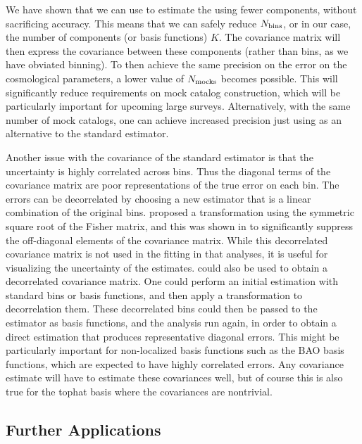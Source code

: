We have shown that we can use \est to estimate the \cf using fewer components, without sacrificing accuracy.
This means that we can safely reduce $N_\mathrm{bins}$, or in our case, the number of components (or basis functions) $K$.
The covariance matrix will then express the covariance between these components (rather than bins, as we have obviated binning).
To then achieve the same precision on the error on the cosmological parameters, a lower value of $N_\mathrm{mocks}$ becomes possible.
This will significantly reduce requirements on mock catalog construction, which will be particularly important for upcoming large surveys. 
Alternatively, with the same number of mock catalogs, one can achieve increased precision just using \est as an alternative to the standard estimator.

Another issue with the covariance of the standard estimator is that the uncertainty is highly correlated across bins.
Thus the diagonal terms of the covariance matrix are poor representations of the true error on each bin.
The errors can be decorrelated by choosing a new estimator that is a linear combination of the original \cf bins. 
\cite{Hamilton2000} proposed a transformation using the symmetric square root of the Fisher matrix, and this was shown in \cite{Anderson2014} to significantly suppress the off-diagonal elements of the covariance matrix.
While this decorrelated covariance matrix is not used in the fitting in that analyses, it is useful for visualizing the uncertainty of the \cf estimates.
\Est could also be used to obtain a decorrelated covariance matrix.
One could perform an initial estimation with standard bins or basis functions, and then apply a transformation to decorrelation them.
These decorrelated bins could then be passed to the estimator as basis functions, and the analysis run again, in order to obtain a direct estimation that produces representative diagonal errors.
This might be particularly important for non-localized basis functions such as the BAO basis functions, which are expected to have highly correlated errors.
Any covariance estimate will have to estimate these covariances well, but of course this is also true for the tophat basis where the covariances are nontrivial.

\subsection{Further Applications}
\label{sec:applications_cfe}

